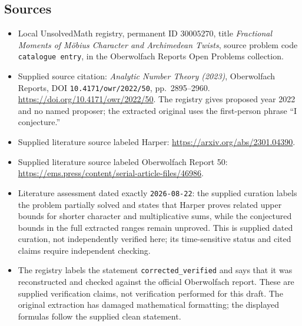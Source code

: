 \documentclass[11pt]{article}
\begin{document}
\subsection{Sources}
\begin{itemize}
\item Local UnsolvedMath registry, permanent ID \(30005270\), title \emph{Fractional Moments of Möbius Character and Archimedean Twists}, source problem code \texttt{catalogue entry}, in the Oberwolfach Reports Open Problems collection.
\item Supplied source citation: \emph{Analytic Number Theory (2023)}, Oberwolfach Reports, DOI \texttt{10.4171/owr/2022/50}, pp.\ 2895--2960. \url{https://doi.org/10.4171/owr/2022/50}. The registry gives proposed year 2022 and no named proposer; the extracted original uses the first-person phrase ``I conjecture.''
\item Supplied literature source labeled Harper: \url{https://arxiv.org/abs/2301.04390}.
\item Supplied literature source labeled Oberwolfach Report 50: \url{https://ems.press/content/serial-article-files/46986}.
\item Literature assessment dated exactly \texttt{2026-08-22}: the supplied curation labels the problem partially solved and states that Harper proves related upper bounds for shorter character and multiplicative sums, while the conjectured bounds in the full extracted ranges remain unproved. This is supplied dated curation, not independently verified here; its time-sensitive status and cited claims require independent checking.
\item The registry labels the statement \texttt{corrected\_verified} and says that it was reconstructed and checked against the official Oberwolfach report. These are supplied verification claims, not verification performed for this draft. The original extraction has damaged mathematical formatting; the displayed formulas follow the supplied clean statement.
\end{itemize}
\end{document}
